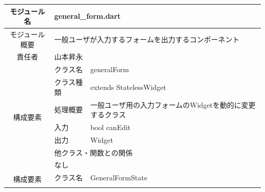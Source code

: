 \begin{table}[H]
  \centering
  \begin{tabular}{|c|l|l|} \hline
    モジュール名                & \multicolumn{2}{l|}{general\_form.dart}                                                                                                        \\ \hline
    モジュール概要               & \multicolumn{2}{p{12cm}|}{一般ユーザが入力するフォームを出力するコンポーネント}                                                                                          \\ \hline
    責任者                   & \multicolumn{2}{l|}{山本昇永}                                                                                                                      \\ \hline
    \multirow{7}{*}{構成要素} & クラス名                                                                              & generalForm                                                \\ \cline{2-3}
                          & クラス種類                                                                             & extends StatelessWidget                                    \\ \cline{2-3}
                          & 処理概要                                                                              & \multicolumn{1}{p{12cm}|}{一般ユーザ用の入力フォームのWidgetを動的に変更するクラス} \\ \cline{2-3}
                          & 入力                                                                                & bool canEdit                                               \\ \cline{2-3}
                          & 出力                                                                                & Widget                                                     \\ \cline{2-3}
                          & \multicolumn{2}{l|}{他クラス・関数との関係}                                                                                                               \\ \cline{2-3}
                          & \multicolumn{2}{p{14cm}|}{なし}                                                                                                                  \\ \hline
    \multirow{7}{*}{構成要素} & クラス名                                                                              & GeneralFormState                                           \\ \cline{2-3}

\end{tabular}
\end{table}
